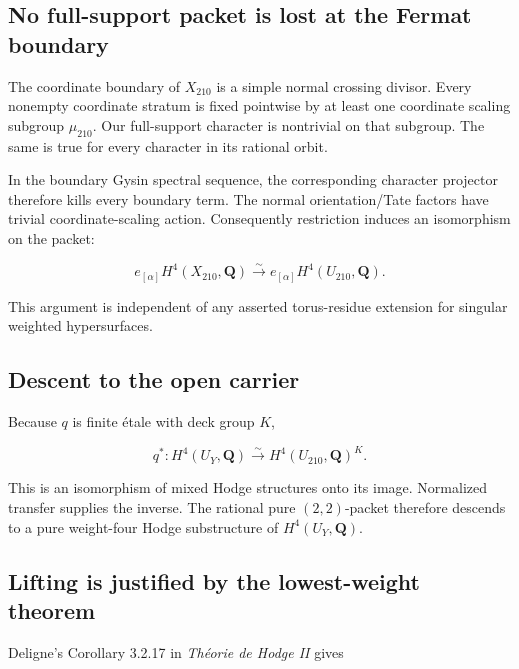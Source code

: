 \hypertarget{carrier70-no-full-support-packet-is-lost-at-the-fermat-boundary}{%
\subsection{No full-support packet is lost at the Fermat
boundary}\label{carrier70-no-full-support-packet-is-lost-at-the-fermat-boundary}}

The coordinate boundary of \(X_{210}\) is a simple normal crossing
divisor. Every nonempty coordinate stratum is fixed pointwise by at
least one coordinate scaling subgroup \(\mu_{210}\). Our full-support
character is nontrivial on that subgroup. The same is true for every
character in its rational orbit.

In the boundary Gysin spectral sequence, the corresponding character
projector therefore kills every boundary term. The normal
orientation/Tate factors have trivial coordinate-scaling action.
Consequently restriction induces an isomorphism on the packet:

\[
e_{[\alpha]}H^4(X_{210},\mathbf Q)
\xrightarrow{\sim}
e_{[\alpha]}H^4(U_{210},\mathbf Q).
\]

This argument is independent of any asserted torus-residue extension for
singular weighted hypersurfaces.

\hypertarget{carrier70-descent-to-the-open-carrier}{%
\subsection{Descent to the open
carrier}\label{carrier70-descent-to-the-open-carrier}}

Because \(q\) is finite étale with deck group \(K\),

\[
q^*:H^4(U_Y,\mathbf Q)
\xrightarrow{\sim}H^4(U_{210},\mathbf Q)^K.
\]

This is an isomorphism of mixed Hodge structures onto its image.
Normalized transfer supplies the inverse. The rational pure
\((2,2)\)-packet therefore descends to a pure weight-four Hodge
substructure of \(H^4(U_Y,\mathbf Q)\).

\hypertarget{carrier70-lifting-is-justified-by-the-lowest-weight-theorem}{%
\subsection{Lifting is justified by the lowest-weight
theorem}\label{carrier70-lifting-is-justified-by-the-lowest-weight-theorem}}

Deligne's Corollary 3.2.17 in \emph{Théorie de Hodge II} gives

